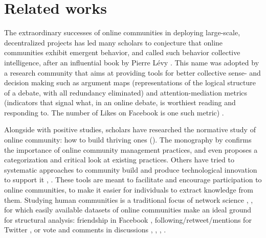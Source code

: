 \documentclass{bmcart}
\begin{document}

\section{Related works}
\label{sec:related_works}
The extraordinary successes of online communities in deploying large-scale, decentralized projects has led many scholars to conjecture that online communities exhibit emergent behavior, and called such behavior collective intelligence, after an influential book by Pierre L\'evy \cite{pierre1997collective}. This name was adopted by a research community that aims at providing tools for better collective sense- and decision making such as argument maps (representations of the logical structure of a debate, with all redundancy eliminated) \cite{shum2003roots} and attention-mediation metrics (indicators that signal what, in an online debate, is worthiest reading and responding to. The number of Likes on Facebook is one such metric) \cite{klein2012enabling}. 

Alongside with positive studies, scholars have researched the normative study of online community: how to build thriving ones (\cite{kraut2012building}). The monography by  \cite{kraut2012building} confirms the  importance of online community management practices, and even proposes a categorization and critical look at existing practices. Others have tried to systematic approaches to community build \cite{diplaris2011emerging} and produce technological innovation to support it \cite{shum2003roots}, \cite{de2012contested}. 
These tools are meant to facilitate and encourage participation to online communities, to make it easier for individuals to extract knowledge from them.
Studying human communities is a traditional focus of network science \cite{borgatti2009network}, \cite{burt2009structural}, for which  easily available datasets of online communities make an ideal ground for structural analysis: friendship in Facebook \cite{lewis2008tastes}\cite{nick2013toward}, following/retweet/mentions for Twitter \cite{kunegis2013preferential} \cite{java2007we} \cite{hodas2014simple}, or vote and comments in discussions \cite{hodas2014simple}, \cite{laniado2011wikipedians}, \cite{zhang2007expertise}, \cite{zanetti2012quantitative}. 
\end{document}
